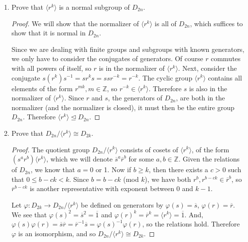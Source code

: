 \documentclass{article}
\begin{document}
\begin{enumerate}[label=(\alph*), itemsep=0em]
    \item Prove that $\langle r^k \rangle$ is a normal subgroup of $D_{2n}$.
          \begin{proof}
            We will show that the normalizer of $\langle r^k \rangle$ is all of $D_{2n}$, which suffices to show that it is normal in $D_{2n}$.

            Since we are dealing with finite groups and subgroups with known generators, we only have to consider the conjugates of generators. Of course $r$ commutes with all powers of itself, so $r$ is in the normalizer of $\langle r^k \rangle$. Next, consider the conjugate $s(r^k)s^{-1} = sr^ks = ssr^{-k} = r^{-k}$. The cyclic group $\langle r^k \rangle$ contains all elements of the form $r^{mk}, m \in \mathbb{Z}$, so $r^{-k} \in \langle r^k \rangle$. Therefore $s$ is also in the normalizer of $\langle r^k \rangle$. Since $r$ and $s$, the generators of $D_{2n}$, are both in the normalizer (and the normalizer is closed), it must then be the entire group $D_{2n}$. Therefore $\langle r^k \rangle \unlhd D_{2n}$.
          \end{proof}
    \item Prove that $D_{2n}/\langle r^k \rangle \cong D_{2k}$.
          \begin{proof}
            The quotient group $D_{2n}/\langle r^k \rangle$ consists of cosets of $\langle r^k \rangle$, of the form $(s^a r^b) \langle r^k \rangle$, which we will denote $\overline{s}^a \overline{r}^b$ for some $a, b \in \mathbb{Z}$. Given the relations of $D_{2n}$, we know that $a = 0$ or 1. Now if $b \geq k$, then there exists a $c > 0$ such that $0 \leq b - ck < k$. Since $b = b - ck$ (mod $k$), we have both $r^b, r^{b - ck} \in \overline{r}^b$, so $\overline{r}^{b - ck}$ is another representative with exponent between $0$ and $k - 1$.

            Let $\varphi: D_{2k} \rightarrow D_{2n}/\langle r^k \rangle $ be defined on generators by $\varphi(s) = \overline{s}$, $\varphi(r) = \overline{r}$. We see that $\varphi(s)^2 = \overline{s}^2 = \overline{1}$ and $\varphi(r)^k = \overline{r}^k = \langle r^k \rangle = \overline{1}$. And, $\varphi(s) \varphi(r) = \overline{s} \overline{r} = \overline{r}^{-1} \overline{s} = \varphi(s)^{-1} \varphi(r)$, so the relations hold. Therefore $\varphi$ is an isomorphism, and so $D_{2n}/\langle r^k \rangle \cong D_{2k}$.
          \end{proof}
\end{enumerate}
\end{document}
